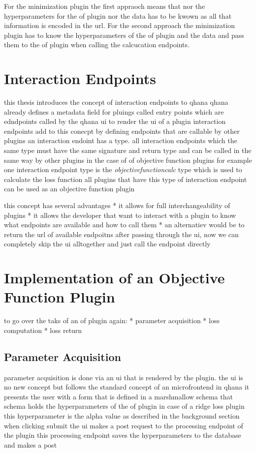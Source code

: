 \documentclass[
  a4paper,  %
  twoside,  %
  bibliography=totoc,
  headsepline,
  cleardoublepage=empty,
  parskip=half,
  draft=false
]{scrbook}
\begin{document}
For the minimization plugin the first appraoch means that nor the hyperparameters for the \gls{of} plugin nor the data has to be kwown as all that information is encoded in the url.
For the second approach the minimization plugin has to know the hyperparameters of the \gls{of} plugin and the data and pass them to the \gls{of} plugin when calling the calcucation endpoints.


\section{Interaction Endpoints}
\label{sec:interactionEndpoints}
this thesis introduces the concept of interaction endpoints to \gls{qhana}
qhana already defines a metadata field for pluings called entry points which are edndpoints called by the qhana ui to render the ui of a plugin
interaction endpoints add to this conecpt by defining endpoints that are callable by other plugins
an interaction endoint has a type.
all interaction endpoints which the same type must have the same signature and return type and can be called in the same way by other plugins
in the case of of objective function plugins for example one interaction endpoint type is the \emph{objectivefunctioncalc} type which is used to calculate the loss function
all plugins that have this type of interaction endpoint can be used as an objective function plugin

this concept has several advantages
* it allows for full interchangeability of plugins
* it allows the developer that want to interact with a plugin to know what endpoints are available and how to call them
* an alternatiev would be to return the url of available endpoitns after passing through the ui, now we can completely skip the ui alltogether and just call the endpoint directly


\section{Implementation of an Objective Function Plugin}
\label{sec:implementationOfAnObjectiveFunctionPlugin}

to go over the taks of an of plugin again:
* parameter acquisition
* loss computation
* loss return

\subsection{Parameter Acquisition}
\label{subsec:parameterAcquisition}
parameter acquisition is done via an ui that is rendered by the plugin.
the ui is no new concept but follows the standard concept of an microfrontend in qhana
it presents the user with a form that is defined in a marshmallow schema
that schema holds the hyperparameters of the of plugin
in case of a ridge loss plugin this hyperparameter is the alpha value as described in the background section
when clicking submit the ui makes a post request to the processing endpoint of the plugin
this processing endpoint saves the hyperparameters to the database and makes a post
\end{document}
